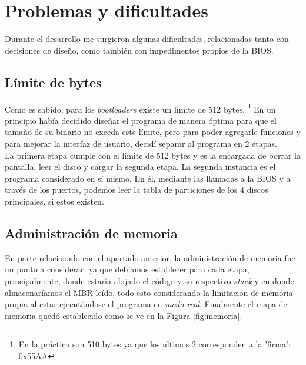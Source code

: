 \documentclass[a4paper, 11pt]{article}
\begin{document}
\section*{Problemas y dificultades}
Durante el desarrollo me surgieron algunas dificultades, relacionadas tanto con decisiones de dise\~no, como tambi\'en con impedimentos propios de la BIOS.

\subsection*{L\'imite de bytes}
Como es sabido, para los \textit{bootloaders} existe un l\'imite de 512 bytes. \footnote{En la pr\'actica son 510 bytes ya que los ultimos 2 corresponden a la 'firma': 0x55AA} En un principio hab\'ia decidido dise\~nar el programa de manera \'optima para que el tama\~no de su binario no exceda este l\'imite, pero para poder agregarle funciones y para mejorar la interfaz de usuario, decid\'i separar al programa en 2 etapas.
\\

La primera etapa cumple con el l\'imite de 512 bytes y es la encargada de borrar la pantalla, leer el disco y cargar la segunda etapa. La segunda instancia es el programa considerado en s\'i mismo. En \'el, mediante las llamadas a la BIOS y a trav\'es de los puertos, podemos leer la tabla de particiones de los 4 discos principales, si estos existen.

\subsection*{Administraci\'on de memoria}

En parte relacionado con el apartado anterior, la administraci\'on de memoria fue un punto a considerar, ya que debiamos establecer para cada etapa, principalmente, donde estar\'ia alojado el c\'odigo y su respectivo \textit{stack} y en donde almacenar\'iamos el MBR le\'ido, todo esto considerando la limitaci\'on de memoria propia al estar ejecut\'andose el programa en \textit{modo real}. Finalmente el mapa de memoria qued\'o establecido como se ve en la Figura \ref{fig:memoria}.
\end{document}
